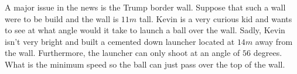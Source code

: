 
A major issue in the news is the Trump border wall. Suppose that such a wall were to be build and the wall is $11m$ tall. Kevin is a very curious kid and wants to see at what angle would it take to launch a ball over the wall. Sadly, Kevin isn't very bright and built a cemented down launcher located at $14m$ away from the wall. Furthermore, the launcher can only shoot at an angle of $56$ degrees. What is the minimum speed so the ball can just pass over the top of the wall. 
